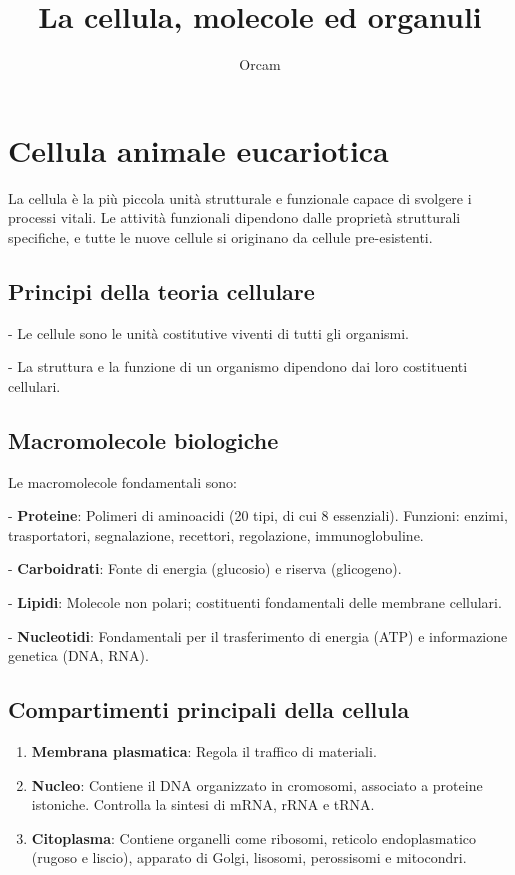\documentclass[a4paper,12pt]{article}
\title{La cellula, molecole ed organuli}
\author{Orcam}
\date{}
\begin{document}
\maketitle

\section*{Cellula animale eucariotica}
La cellula è la più piccola unità strutturale e funzionale capace di svolgere i processi vitali. Le attività funzionali dipendono dalle proprietà strutturali specifiche, e tutte le nuove cellule si originano da cellule pre-esistenti.

\subsection*{Principi della teoria cellulare}

    
- Le cellule sono le unità costitutive viventi di tutti gli organismi.
    
- La struttura e la funzione di un organismo dipendono dai loro costituenti cellulari.


\subsection*{Macromolecole biologiche}
Le macromolecole fondamentali sono:

    
- \textbf{Proteine}: Polimeri di aminoacidi (20 tipi, di cui 8 essenziali). Funzioni: enzimi, trasportatori, segnalazione, recettori, regolazione, immunoglobuline.
    
- \textbf{Carboidrati}: Fonte di energia (glucosio) e riserva (glicogeno).
    
- \textbf{Lipidi}: Molecole non polari; costituenti fondamentali delle membrane cellulari.
    
- \textbf{Nucleotidi}: Fondamentali per il trasferimento di energia (ATP) e informazione genetica (DNA, RNA).


\subsection*{Compartimenti principali della cellula}
\begin{enumerate}
    \item \textbf{Membrana plasmatica}: Regola il traffico di materiali.
    \item \textbf{Nucleo}: Contiene il DNA organizzato in cromosomi, associato a proteine istoniche. Controlla la sintesi di mRNA, rRNA e tRNA.
    \item \textbf{Citoplasma}: Contiene organelli come ribosomi, reticolo endoplasmatico (rugoso e liscio), apparato di Golgi, lisosomi, perossisomi e mitocondri.
\end{enumerate}
\end{document}
